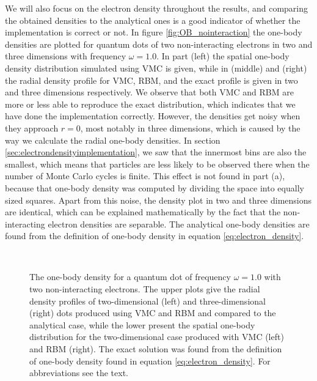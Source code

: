 We will also focus on the electron density throughout the results, and comparing the obtained densities to the analytical ones is a good indicator of whether the implementation is correct or not. In figure \eqref{fig:OB_nointeraction} the one-body densities are plotted for quantum dots of two non-interacting electrons in two and three dimensions with frequency $\omega=1.0$. In part (left) the spatial one-body density distribution simulated using VMC is given, while in (middle) and (right) the radial density profile for VMC, RBM, and the exact profile is given in two and three dimensions respectively. We observe that both VMC and RBM are more or less able to reproduce the exact distribution, which indicates that we have done the implementation correctly. However, the densities get noisy when they approach $r=0$, most notably in three dimensions, which is caused by the way we calculate the radial one-body densities. In section \ref{sec:electrondensityimplementation}, we saw that the innermost bins are also the smallest, which means that particles are less likely to be observed there when the number of Monte Carlo cycles is finite. This effect is not found in part (a), because that one-body density was computed by dividing the space into equally sized squares. Apart from this noise, the density plot in two and three dimensions are identical, which can be explained mathematically by the fact that the non-interacting electron densities are separable. The analytical one-body densities are found from the definition of one-body density in equation \eqref{eq:electron_density}.

\begin{figure}
	\centering
	\captionsetup[subfigure]{labelformat=empty}
	\\
	
	\caption{The one-body density for a quantum dot of frequency $\omega=1.0$ with two non-interacting electrons. The upper plots give the radial density profiles of two-dimensional (left) and three-dimensional (right) dots produced using VMC and RBM and compared to the analytical case, while the lower present the spatial one-body distribution for the two-dimensional case produced with VMC (left) and RBM (right). The exact solution was found from the definition of one-body density found in equation \eqref{eq:electron_density}. For abbreviations see the text.}
	\label{fig:OB_nointeraction}
\end{figure}

